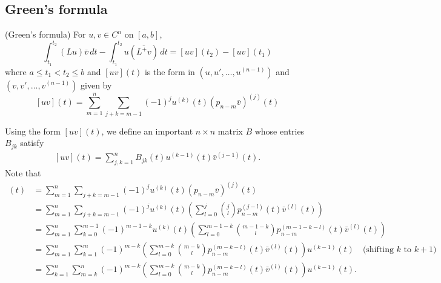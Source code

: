 \documentclass[11pt, oneside, a4paper]{article}
\begin{document}
\subsection{Green's formula}
\begin{thm}\cite[p.284]{CoddingtonLevinson}{(Green's formula)}\label{thm:green's formula}
    For $u, v\in C^n$ on $[a,b]$,
    \begin{equation}\label{eq:green's formula}
        \int_{t_1}^{t_2}(Lu)\bar{v}\,dt - \int_{t_1}^{t_2}u(\overline{L^+v})\,dt = [uv](t_2) - [uv](t_1) 
    \end{equation}
    where $a\leq t_1<t_2\leq b$ and $[uv](t)$ is the form in $(u, u', \ldots, u^{(n-1)})$ and $(v, v', \ldots, v^{(n-1)})$ given by
    \begin{equation}\label{eq:[uv](t) defn}
        [uv](t)=\sum_{m=1}^n\sum_{j+k=m-1}(-1)^j u^{(k)}(t)(p_{n-m}\bar{v})^{(j)}(t)
    \end{equation}
\end{thm}
Using the form $[uv](t)$, we define an important $n\times n$ matrix $B$ whose entries $B_{jk}$ satisfy
\begin{equation}\label{eq:[uv](t) in B matrix}
    \begin{split}
        [uv](t) = \sum_{j,k=1}^n B_{jk}(t)u^{(k-1)}(t)\bar{v}^{(j-1)}(t).
    \end{split}
\end{equation}
Note that
\begin{align*}
    [uv](t) &= \sum_{m=1}^n\sum_{j+k=m-1}(-1)^j u^{(k)}(t)(p_{n-m}\bar{v})^{(j)}(t)\\
        &= \sum_{m=1}^n\sum_{j+k=m-1}(-1)^j u^{(k)}(t)\left(\sum_{l=0}^j\binom{j}{l}p_{n-m}^{(j-l)}(t)\bar{v}^{(l)}(t)\right)\\
        &= \sum_{m=1}^n\sum_{k=0}^{m-1}(-1)^{m-1-k} u^{(k)}(t)\left(\sum_{l=0}^{m-1-k}\binom{m-1-k}{l}p_{n-m}^{(m-1-k-l)}(t)\bar{v}^{(l)}(t)\right)\\
        &= \sum_{m=1}^n\sum_{k=1}^{m}(-1)^{m-k}\left(\sum_{l=0}^{m-k}\binom{m-k}{l}p_{n-m}^{(m-k-l)}(t)\bar{v}^{(l)}(t)\right)u^{(k-1)}(t)\quad\mbox{(shifting $k$ to $k+1$)}\\
        &= \sum_{k=1}^n\sum_{m=k}^n (-1)^{m-k}\left(\sum_{l=0}^{m-k}\binom{m-k}{l}p_{n-m}^{(m-k-l)}(t)\bar{v}^{(l)}(t)\right)u^{(k-1)}(t).
\end{align*}
\end{document}

